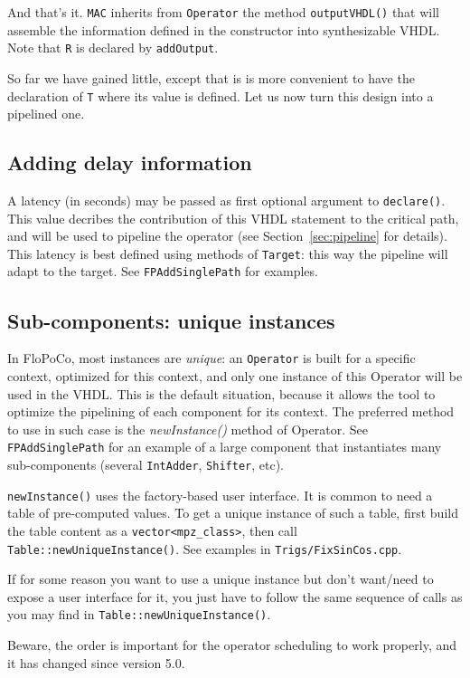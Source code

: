 \documentclass{article}
\begin{document}
And that's it. \verb!MAC! inherits from \verb!Operator! the method
\verb!outputVHDL()! that will assemble the information defined in the
constructor into synthesizable VHDL. Note that \verb!R! is declared by \verb!addOutput!.

So far we have gained little, except that is is more convenient to
have the declaration of \verb!T! where its value is defined. Let us
now turn this design into a pipelined one.

\subsection{Adding delay information}
A latency (in seconds) may be passed as first optional argument to  \texttt{declare()}.
  This value decribes the contribution of this VHDL statement to the critical path, and will be used to pipeline the operator (see Section~\ref{sec:pipeline} for details).
  This latency is best defined using methods of \texttt{Target}: this way the pipeline will adapt to the target.
  See \texttt{FPAddSinglePath} for examples.

\subsection{Sub-components: unique instances}

In FloPoCo, most instances are \emph{unique}: an \texttt{Operator} is built for a specific context, optimized for this context, and only one instance of this Operator will be used in the VHDL.
This is the default situation, because it allows the tool to optimize the pipelining of each component for its context.
The preferred method to use in such case is the \emph{newInstance()} method of Operator. 
See \texttt{FPAddSinglePath} for an example of a large component that instantiates many sub-components (several \texttt{IntAdder}, \texttt{Shifter}, etc).

\texttt{newInstance()} uses the factory-based user interface.
It is common to need a table of pre-computed values.
To get a unique instance of such a table,  first build the table content as a \verb!vector<mpz_class>!, then call \texttt{Table::newUniqueInstance()}.
See examples in \texttt{Trigs/FixSinCos.cpp}.


If for some reason you want to use a unique instance but don't want/need to expose a user interface for it, you just have to follow the same sequence of calls as you may find in \texttt{Table::newUniqueInstance()}.

Beware, the order is important for the operator scheduling to work properly, and it has changed since version 5.0.
\end{document}
